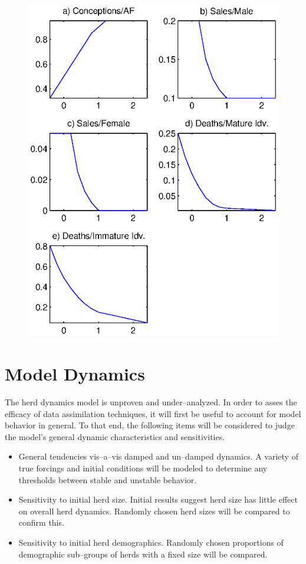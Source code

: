 \documentclass[fleqn, letterpaper]{amsart}
\begin{document}
\begin{figure}
\includegraphics[width=1.0\textwidth]{refrel}
\label{rferels}
\end{figure}
\section{Model Dynamics}
The herd dynamics model is unproven and under--analyzed. In order to asses the efficacy of data assimilation techniques, it will first be useful to account for model behavior in general. To that end, the following items will be considered to judge the model's general dynamic characteristics and sensitivities. 
\begin{itemize}
  \item General tendencies vis--a--vis damped and un--damped dynamics. A variety of true forcings and initial conditions will be modeled to determine any thresholds between stable and unstable behavior.
  \item Sensitivity to initial herd size. Initial results suggest herd size has little effect on overall herd dynamics. Randomly chosen herd sizes will be compared to confirm this.
  \item Sensitivity to initial herd demographics. Randomly chosen proportions of demographic sub--groups of herds with a fixed size will be compared.
  \end{itemize}
\end{document}
